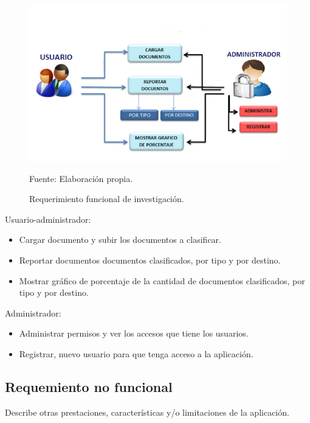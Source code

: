 \begin{figure}[h!]
	\centering
		\includegraphics[scale=0.7]{imagenes/reqFuncional.png}
		\caption{Requerimiento funcional de investigación.}
	\begin{center}
    Fuente: Elaboración propia.
    \end{center}
	\label{fig:reqFuncional}
\end{figure}
\newpage
Usuario-administrador: 
\begin{itemize}
    \item Cargar documento y subir los documentos a clasificar.
    \item Reportar documentos documentos clasificados, por tipo y por destino.
    \item Mostrar gráfico de porcentaje de la cantidad de documentos clasificados, por tipo y por destino.
\end{itemize}
Administrador: 
\begin{itemize}
    \item Administrar permisos y ver los accesos que tiene los usuarios.
    \item Registrar, nuevo usuario para que tenga acceso a la aplicación. 
\end{itemize}

\subsection{Requemiento no funcional}
Describe otras prestaciones, características y/o limitaciones de la aplicación.

